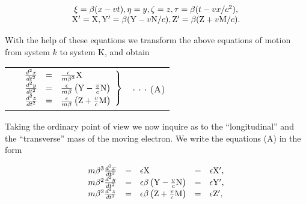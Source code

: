 \documentclass{article}
\begin{document}
\[
\begin{array}{c}
\xi = \beta(x-vt), \eta=y, \zeta=z, \tau=\beta(t-vx/c^2),\\
{\rm X}' = {\rm X}, {\rm Y}'=\beta({\rm Y}-v{\rm N}/c), {\rm Z}'=\beta({\rm Z}+v{\rm M}/c).\\
\end{array}
\]

With the help of these equations we transform the above equations of
motion from system $k$ to system K, and obtain

\begin{raggedleft}
\begin{tabular}{lll}
\hspace*{8em} &

\begin{math}
\left.
\begin{array}{rcl}
\frac{d^2x}{dt^2} & = & \frac{\epsilon}{m\beta^3}{\rm X} \\
\frac{d^2y}{dt^2} & = & \frac{\epsilon}{m\beta}\left({\rm Y}-\frac{v}{c}{\rm N}\right) \\
\frac{d^2z}{dt^2} & = & \frac{\epsilon}{m\beta}\left({\rm Z}+\frac{v}{c}{\rm M}\right) \\
\end{array}
\right\}
\end{math}
&
$\cdot$ \hspace{2em} $\cdot$ \hspace{2em} $\cdot$ \hspace{2em}   ({\rm A})
\end{tabular}
\end{raggedleft}

Taking the ordinary point of view we now inquire as to the
``longitudinal'' and the ``transverse'' mass of the moving electron.  We
write the equations (A) in the form

\[
\begin{array}{lllll}
m\beta^3\frac{d^2x}{dt^2} & = & \epsilon{\rm X} & = & \epsilon{\rm X}', \\
m\beta^2\frac{d^2y}{dt^2} & = & \epsilon\beta\left({\rm Y}-\frac{v}{c}{\rm N}\right) & = & \epsilon{\rm Y}', \\
m\beta^2\frac{d^2z}{dt^2} & = & \epsilon\beta\left({\rm Z}+\frac{v}{c}{\rm M}\right) & = & \epsilon{\rm Z}', \\
\end{array}
\]
\end{document}

